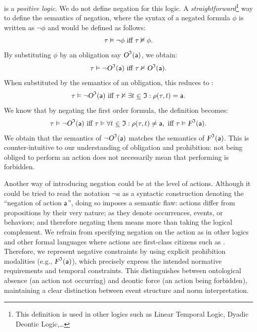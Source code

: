 \begin{remark}
\TDDLfm is a \textit{positive logic}. We do not define negation for this logic. A \emph{straightforward}\footnote{This definition is used in other logics such as Linear Temporal Logic, Dyadic Deontic Logic,\dots } way to define the semantics of negation, where the syntax of a negated formula $\phi$ is written as $\lnot \phi$ and would be defined as follows:
$$\tau \vDash  \lnot \phi \text{ iff }  \tau \nvDash \phi. \label{niga}$$
By substituting $\phi$ by an obligation say $\textsl{O}^{\mathfrak{I}}(\mathsf{a})$, we obtain: 
\[\tau \vDash  \lnot \textsl{O}^{\mathfrak{I}}(\mathsf{a}) \text{ iff }  \tau \nvDash \textsl{O}^{\mathfrak{I}}(\mathsf{a}).\]
When substituted by the semantics of an obligation, this reduces to :
\[\tau \vDash  \lnot \textsl{O}^{\mathfrak{I}}(\mathsf{a}) \text{ iff }  \tau \nvDash \exists t ~\underline{\in}~ \mathfrak{I}:  \rho(\tau,t)=\mathsf{a}.\]
We know that by negating the first order formula, the definition becomes:
\[\tau \vDash  \lnot \textsl{O}^{\mathfrak{I}}(\mathsf{a}) \text{ iff }  \tau \vDash \forall t ~\underline{\in}~ \mathfrak{I}:  \rho(\tau,t)\neq \mathsf{a}, \text{ iff } \tau \vDash  \textsl{F}^{\mathfrak{I}}(\mathsf{a}).\]
We obtain that the semantics of $\lnot \textsl{O}^{\mathfrak{I}}(\mathsf{a}) $ matches the semantics of $\textsl{F}^{\mathfrak{I}}(\mathsf{a}) $.
This is counter-intuitive to our understanding of obligation and prohibition:  not being obliged to perform an action \acta does not necessarily mean that performing \acta is forbidden. 

Another way of introducing negation could be at the level of actions. Although it could be tried to read the notation $\lnot a$ as a syntactic construction denoting the ``negation of action $\mathsf{a} $'', doing so imposes a semantic flaw: actions differ from propositions by their very nature; as they denote occurrences, events, or behaviors; and therefore negating them means more than taking the logical complement. We refrain from specifying negation on the action as in other logics and other formal languages where actions are first-class citizens such as \cite{hoare1978communicating,harel2001dynamic,horty2001agency,de2013linear}. Therefore, we represent negative constraints by using explicit prohibition modalities (e.g., $\textsl{F}^{\mathfrak{I}}(\mathsf{a})$), which precisely express the intended normative requirements and temporal constraints. This distinguishes between ontological absence (an action not occurring) and deontic force (an action being forbidden), maintaining a clear distinction between event structure and norm interpretation.
\end{remark}



